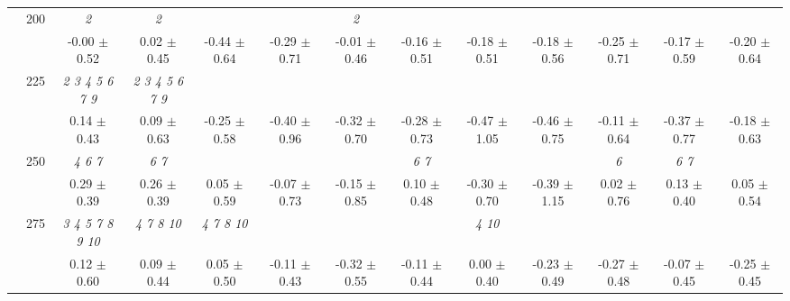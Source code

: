 \begin{table}[h]
{\begin{tabular}{
        ccccccccccccc}
 & \multirow{2}{*}{200}& \textit{ 2 }& \textit{ 2 }& & & \textit{ 2 }& & & & & &  \\ 
 & & -0.00 $\pm$ 0.52& 0.02 $\pm$ 0.45& -0.44 $\pm$ 0.64& -0.29 $\pm$ 0.71& -0.01 $\pm$ 0.46& -0.16 $\pm$ 0.51& -0.18 $\pm$ 0.51& -0.18 $\pm$ 0.56& -0.25 $\pm$ 0.71& -0.17 $\pm$ 0.59& -0.20 $\pm$ 0.64 \\ 
 & \multirow{2}{*}{225}& \cellcolor[HTML]{EFEFEF} \textit{ 2 3 4 5 6 7 9 }& \cellcolor[HTML]{EFEFEF} \textit{ 2 3 4 5 6 7 9 }& \cellcolor[HTML]{EFEFEF} & \cellcolor[HTML]{EFEFEF} & \cellcolor[HTML]{EFEFEF} & \cellcolor[HTML]{EFEFEF} & \cellcolor[HTML]{EFEFEF} & \cellcolor[HTML]{EFEFEF} & \cellcolor[HTML]{EFEFEF} & \cellcolor[HTML]{EFEFEF} & \cellcolor[HTML]{EFEFEF}  \\ 
 & & \cellcolor[HTML]{EFEFEF} 0.14 $\pm$ 0.43& \cellcolor[HTML]{EFEFEF} 0.09 $\pm$ 0.63& \cellcolor[HTML]{EFEFEF} -0.25 $\pm$ 0.58& \cellcolor[HTML]{EFEFEF} -0.40 $\pm$ 0.96& \cellcolor[HTML]{EFEFEF} -0.32 $\pm$ 0.70& \cellcolor[HTML]{EFEFEF} -0.28 $\pm$ 0.73& \cellcolor[HTML]{EFEFEF} -0.47 $\pm$ 1.05& \cellcolor[HTML]{EFEFEF} -0.46 $\pm$ 0.75& \cellcolor[HTML]{EFEFEF} -0.11 $\pm$ 0.64& \cellcolor[HTML]{EFEFEF} -0.37 $\pm$ 0.77& \cellcolor[HTML]{EFEFEF} -0.18 $\pm$ 0.63 \\ 
 & \multirow{2}{*}{250}& \textit{ 4 6 7 }& \textit{ 6 7 }& & & & \textit{ 6 7 }& & & \textit{ 6 }& \textit{ 6 7 }&  \\ 
 & & 0.29 $\pm$ 0.39& 0.26 $\pm$ 0.39& 0.05 $\pm$ 0.59& -0.07 $\pm$ 0.73& -0.15 $\pm$ 0.85& 0.10 $\pm$ 0.48& -0.30 $\pm$ 0.70& -0.39 $\pm$ 1.15& 0.02 $\pm$ 0.76& 0.13 $\pm$ 0.40& 0.05 $\pm$ 0.54 \\ 
 & \multirow{2}{*}{275}& \cellcolor[HTML]{EFEFEF} \textit{  3  4  5  7  8  9 10 }& \cellcolor[HTML]{EFEFEF} \textit{  4  7  8 10 }& \cellcolor[HTML]{EFEFEF} \textit{  4  7  8 10 }& \cellcolor[HTML]{EFEFEF} & \cellcolor[HTML]{EFEFEF} & \cellcolor[HTML]{EFEFEF} & \cellcolor[HTML]{EFEFEF} \textit{  4 10 }& \cellcolor[HTML]{EFEFEF} & \cellcolor[HTML]{EFEFEF} & \cellcolor[HTML]{EFEFEF} & \cellcolor[HTML]{EFEFEF}  \\ 
 & & \cellcolor[HTML]{EFEFEF} 0.12 $\pm$ 0.60& \cellcolor[HTML]{EFEFEF} 0.09 $\pm$ 0.44& \cellcolor[HTML]{EFEFEF} 0.05 $\pm$ 0.50& \cellcolor[HTML]{EFEFEF} -0.11 $\pm$ 0.43& \cellcolor[HTML]{EFEFEF} -0.32 $\pm$ 0.55& \cellcolor[HTML]{EFEFEF} -0.11 $\pm$ 0.44& \cellcolor[HTML]{EFEFEF} 0.00 $\pm$ 0.40& \cellcolor[HTML]{EFEFEF} -0.23 $\pm$ 0.49& \cellcolor[HTML]{EFEFEF} -0.27 $\pm$ 0.48& \cellcolor[HTML]{EFEFEF} -0.07 $\pm$ 0.45& \cellcolor[HTML]{EFEFEF} -0.25 $\pm$ 0.45 \\ 

\end{tabular}}
\end{table}

